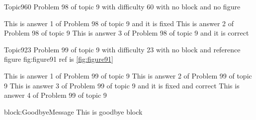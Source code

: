 \documentclass[master]{exam}
\begin{document}
\begin{problem}{Topic9}{60}
	Problem 98 of topic 9 with difficulty 60 with no block and no figure
	\begin{answers}
		\answer[fixed] This is answer 1 of Problem 98 of topic 9 and it is fixed
		\answer This is answer 2 of Problem 98 of topic 9 
		\answer[correct] This is answer 3 of Problem 98 of topic 9 and it is correct
	\end{answers}
\end{problem}

\begin{problem}{Topic9}{23}
	Problem 99 of topic 9 with difficulty 23 with no block and reference figure fig:figure91 ref is \ref{fig:figure91}
	\begin{answers}
		\answer This is answer 1 of Problem 99 of topic 9 
		\answer This is answer 2 of Problem 99 of topic 9 
		 This is answer 3 of Problem 99 of topic 9 and it is fixed and correct
		\answer This is answer 4 of Problem 99 of topic 9 
	\end{answers}
\end{problem}



\begin{block}{block:GoodbyeMessage}
	This is goodbye block
\end{block}
\end{document}
